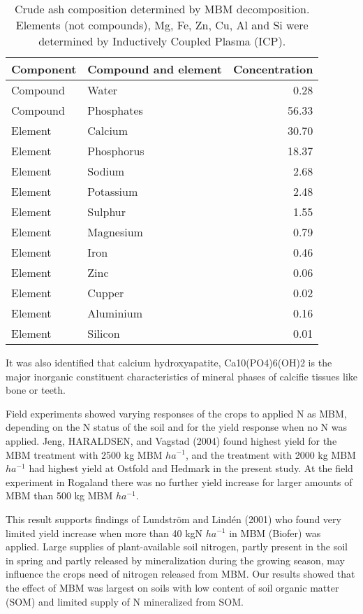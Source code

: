\documentclass[
]{article}
\begin{document}
\begin{longtable}[t]{llr}
\caption{\label{tab:crude-ashes-mbm-combustion}Crude ash composition determined by MBM decomposition. Elements (not compounds), Mg, Fe, Zn, Cu, Al and Si were determined by Inductively Coupled Plasma (ICP).}\\
\toprule
Component & Compound and element & Concentration\\
\midrule
Compound & Water & 0.28\\
Compound & Phosphates & 56.33\\
Element & Calcium & 30.70\\
Element & Phosphorus & 18.37\\
Element & Sodium & 2.68\\
\addlinespace
Element & Potassium & 2.48\\
Element & Sulphur & 1.55\\
Element & Magnesium & 0.79\\
Element & Iron & 0.46\\
Element & Zinc & 0.06\\
\addlinespace
Element & Cupper & 0.02\\
Element & Aluminium & 0.16\\
Element & Silicon & 0.01\\
\bottomrule
\end{longtable}

It was also identified that calcium hydroxyapatite, Ca10(PO4)6(OH)2 is the major inorganic constituent characteristics of mineral phases of calcifie tissues like bone or teeth.

Field experiments showed varying responses of the crops to applied N as MBM, depending on the N status of the soil and for the yield response when no N was applied. Jeng, HARALDSEN, and Vagstad (2004) found highest yield for the MBM treatment with 2500 kg MBM \(ha^{-1}\), and the treatment with 2000 kg MBM \(ha^{-1}\) had highest yield at Ostfold and Hedmark in the present study. At the field experiment in Rogaland there was no further yield increase for larger amounts of MBM than 500 kg MBM \(ha^{-1}\).

This result supports findings of Lundström and Lindén (2001) who found very limited yield increase when more than 40 kgN \(ha^{-1}\) in MBM (Biofer) was applied. Large supplies of plant-available soil nitrogen, partly present in the soil in spring and partly released by mineralization during the growing season, may influence the crops need of nitrogen released from MBM. Our results showed that the effect of MBM was largest on soils with low content of soil organic matter (SOM) and limited supply of N mineralized from SOM.
\end{document}

